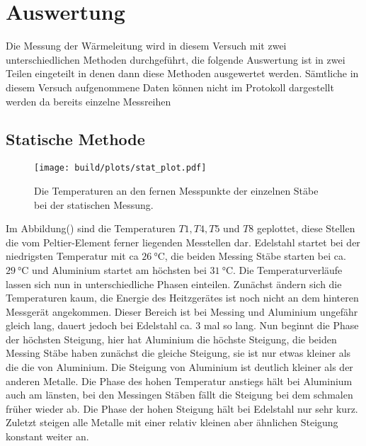 \section{Auswertung}

    \noindent Die Messung der Wärmeleitung wird in diesem Versuch mit zwei unterschiedlichen Methoden durchgeführt, die folgende Auswertung ist 
    in zwei Teilen eingeteilt in denen dann diese Methoden ausgewertet werden. Sämtliche in diesem Versuch aufgenommene Daten können nicht im 
    Protokoll dargestellt werden da bereits einzelne Messreihen 

        \subsection{Statische Methode}

        \begin{figure}[H]
            \centering
            \texttt{[image: build/plots/stat\_plot.pdf]}
            \caption{Die Temperaturen an den fernen Messpunkte der einzelnen Stäbe bei der statischen Messung. }
            \label{fig:plot_stat}
        \end{figure}

        Im Abbildung() sind die Temperaturen $T1, T4, T5$ und $T8$ geplottet, diese Stellen die vom Peltier-Element ferner 
        liegenden Messtellen dar. Edelstahl startet bei der niedrigsten Temperatur mit ca $\SI{26}{\celsius}$, die beiden Messing Stäbe starten 
        bei ca. $\SI{29}{\celsius}$ und Aluminium startet am höchsten bei $\SI{31}{\celsius}$. Die Temperaturverläufe 
        lassen sich nun in unterschiedliche Phasen einteilen. Zunächst ändern sich die Temperaturen kaum, die Energie des 
        Heitzgerätes ist noch nicht an dem hinteren Messgerät angekommen. Dieser Bereich ist bei Messing und 
        Aluminium ungefähr gleich lang, dauert jedoch bei Edelstahl ca. 3 mal so lang. Nun beginnt die Phase der 
        höchsten Steigung, hier hat Aluminium die höchste Steigung, die beiden Messing Stäbe haben zunächst die 
        gleiche Steigung, sie ist nur etwas kleiner als die die von Aluminium. Die Steigung von Aluminium ist 
        deutlich kleiner als der anderen Metalle. Die Phase des hohen Temperatur anstiegs hält bei Aluminium auch am länsten,
        bei den Messingen Stäben fällt die Steigung bei dem schmalen früher wieder ab. Die Phase der hohen Steigung 
        hält bei Edelstahl nur sehr kurz. Zuletzt steigen alle Metalle mit einer relativ kleinen aber ähnlichen Steigung konstant 
        weiter an.

